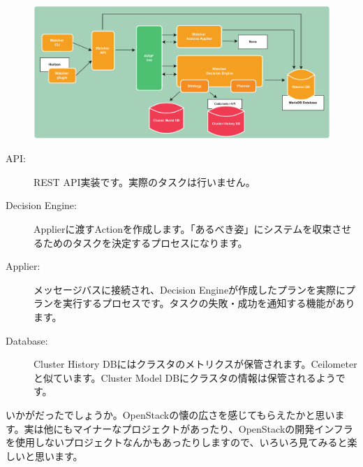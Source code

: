 \begin{figure}[htb]
	\begin{center}
		\includegraphics[width=\textwidth]{img/watcher-architecture.pdf}
	\end{center}
\end{figure}

\begin{description}
	\item[API:] REST API実装です。実際のタスクは行いません。
	\item[Decision Engine:] Applierに渡すActionを作成します。「あるべき姿」にシステムを収束させるためのタスクを決定するプロセスになります。
	\item[Applier:] メッセージバスに接続され、Decision Engineが作成したプランを実際にプランを実行するプロセスです。タスクの失敗・成功を通知する機能があります。
	\item[Database:] Cluster History DBにはクラスタのメトリクスが保管されます。Ceilometerと似ています。Cluster Model DBにクラスタの情報は保管されるようです。
\end{description}

いかがだったでしょうか。OpenStackの懐の広さを感じてもらえたかと思います。実は他にもマイナーなプロジェクトがあったり、OpenStackの開発インフラを使用しないプロジェクトなんかもあったりしますので、いろいろ見てみると楽しいと思います。
